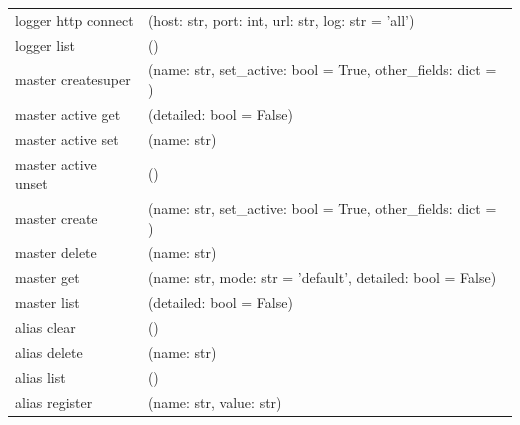 {\begin{table}[ht]
\begin{tabular}{l p{10cm}}
            logger http connect    & (host: str, port: int, url: str, log: str = 'all')                                                                    \\
            logger list            & ()                                                                                                                    \\
            master createsuper     & (name: str, set\_active: bool = True, other\_fields: dict = {})                                                       \\
            master active get      & (detailed: bool = False)                                                                                              \\
            master active set      & (name: str)                                                                                                           \\
            master active unset    & ()                                                                                                                    \\
            master create          & (name: str, set\_active: bool = True, other\_fields: dict = {})                                                       \\
            master delete          & (name: str)                                                                                                           \\
            master get             & (name: str, mode: str = 'default', detailed: bool = False)                                                            \\
            master list            & (detailed: bool = False)                                                                                              \\
            alias clear            & ()                                                                                                                    \\
            alias delete           & (name: str)                                                                                                           \\
            alias list             & ()                                                                                                                    \\
            alias register         & (name: str, value: str)                                                                                               \\

\end{tabular}
\end{table}}
